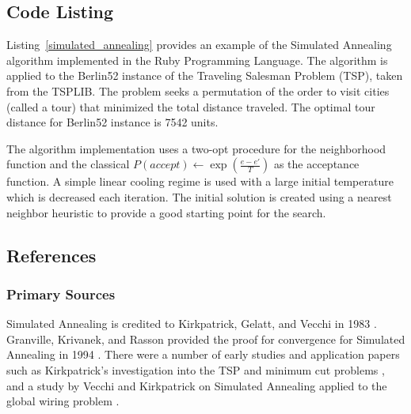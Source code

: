 \subsection{Code Listing}
Listing~\ref{simulated_annealing} provides an example of the Simulated Annealing algorithm implemented in the Ruby Programming Language. 
The algorithm is applied to the Berlin52 instance of the Traveling Salesman Problem (TSP), taken from the TSPLIB. The problem seeks a permutation of the order to visit cities (called a tour) that minimized the total distance traveled. The optimal tour distance for Berlin52 instance is 7542 units.

The algorithm implementation uses a two-opt procedure for the neighborhood function and the classical $P(accept) \leftarrow \exp(\frac{e-e\prime}{T})$ as the acceptance function. A simple linear cooling regime is used with a large initial temperature which is decreased each iteration. The initial solution is created using a nearest neighbor heuristic to provide a good starting point for the search.



\subsection{References}

% 
% 
\subsubsection{Primary Sources}
Simulated Annealing is credited to Kirkpatrick, Gelatt, and Vecchi in 1983 \cite{Kirkpatrick1983}. Granville, Krivanek, and Rasson provided the proof for convergence for Simulated Annealing in 1994 \cite{Granville1994}.
There were a number of early studies and application papers such as Kirkpatrick's investigation into the TSP and minimum cut problems \cite{Kirkpatrick1983a}, and a study by Vecchi and Kirkpatrick on Simulated Annealing applied to the global wiring problem \cite{Vecchi1983}.

